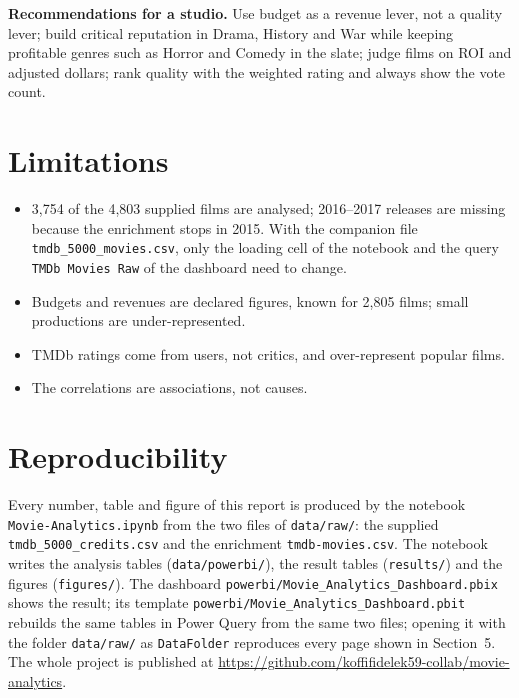 \documentclass[12pt,a4paper]{article}
\begin{document}
\textbf{Recommendations for a studio.} Use budget as a revenue lever, not a quality lever;
build critical reputation in Drama, History and War while keeping profitable genres
such as Horror and Comedy in the slate; judge films on ROI and adjusted dollars; rank
quality with the weighted rating and always show the vote count.

\section{Limitations}

\begin{itemize}
\item 3{,}754 of the 4{,}803 supplied films are analysed; 2016--2017 releases are missing
because the enrichment stops in 2015. With the companion file
\texttt{tmdb\_5000\_movies.csv}, only the loading cell of the notebook and the
query \texttt{TMDb Movies Raw} of the dashboard need to change.
\item Budgets and revenues are declared figures, known for 2{,}805 films; small
productions are under-represented.
\item TMDb ratings come from users, not critics, and over-represent popular films.
\item The correlations are associations, not causes.
\end{itemize}

\section{Reproducibility}

Every number, table and figure of this report is produced by the notebook
\nolinkurl{Movie-Analytics.ipynb} from the two files of \nolinkurl{data/raw/}: the supplied
\nolinkurl{tmdb_5000_credits.csv} and the enrichment \nolinkurl{tmdb-movies.csv}. The notebook
writes the analysis tables (\nolinkurl{data/powerbi/}), the result tables (\nolinkurl{results/})
and the figures (\nolinkurl{figures/}). The dashboard \nolinkurl{powerbi/Movie_Analytics_Dashboard.pbix} shows
the result; its template \nolinkurl{powerbi/Movie_Analytics_Dashboard.pbit} rebuilds the same tables in Power Query from the same two files; opening it with the
folder \nolinkurl{data/raw/} as \nolinkurl{DataFolder} reproduces every page shown in Section~5. The whole project is published at
\url{https://github.com/koffifidelek59-collab/movie-analytics}.
\end{document}
